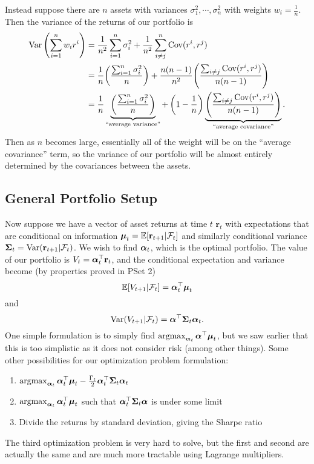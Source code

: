 Instead suppose there are $n$ assets with variances $\sigma_1^2,\cdots,\sigma_n^2$ with weights $w_i=\frac{1}{n}$. Then the variance of the returns of our portfolio is \begin{align*}
	\operatorname{Var} \left( \sum_{i=1}^{n} w_ir^i  \right) &= \frac{1}{n^2} \sum_{i=1}^{n} \sigma_i^2 + \frac{1}{n^2} \sum_{i\neq j}^{n} \operatorname{Cov}(r^i,r^j) \\
											   &= \frac{1}{n} {\left( \frac{\sum_{i=1}^{n} \sigma_i^2}{n} \right)} + \frac{n(n-1)}{n^2} {\left( \frac{\sum_{i\neq j}\operatorname{Cov}(r^i,r^j)}{n(n-1)} \right)} \\
											   &= \frac{1}{n} \underbrace{\left( \frac{\sum_{i=1}^{n} \sigma_i^2}{n} \right)}_{\text{``average variance''}} + \left( 1-\frac{1}{n} \right) \underbrace{\left( \frac{\sum_{i\neq j}\operatorname{Cov}(r^i,r^j)}{n(n-1)} \right)}_{\text{``average covariance''}}.
\end{align*} Then as $n$ becomes large, essentially all of the weight will be on the ``average covariance'' term, so the variance of our portfolio will be almost entirely determined by the covariances between the assets.

\subsection{General Portfolio Setup}
Now suppose we have a vector of asset returns at time $t$ $\mathbf r_t$ with expectations that are conditional on information $\boldsymbol{\mu}_t = \mathbb E[\mathbf r_{t+1}|\mathcal F_t]$ and similarly conditional variance $\boldsymbol{\Sigma}_t = \operatorname{Var}(\mathbf r_{t+1}|\mathcal F_t)$. We wish to find $\boldsymbol{\alpha}_t$, which is the optimal portfolio. The value of our portfolio is $V_t = \boldsymbol{\alpha}_t^\top\mathbf r_t$, and the conditional expectation and variance become (by properties proved in PSet 2) $$ \mathbb E[V_{t+1}|\mathcal F_t] = \boldsymbol{\alpha}_t^\top\boldsymbol{\mu}_t $$ and $$ \operatorname{Var}(V_{t+1}|\mathcal F_t) = \boldsymbol{\alpha}^\top\boldsymbol{\Sigma}_t\boldsymbol{\alpha}_t. $$ One simple formulation is to simply find $\operatorname*{arg max}_{\boldsymbol{\alpha}_t}\boldsymbol{\alpha}^\top\boldsymbol{\mu}_t$, but we saw earlier that this is too simplistic as it does not consider risk (among other things). Some other possibilities for our optimization problem formulation: \begin{enumerate}
	\item $\operatorname*{arg max}_{\boldsymbol{\alpha}_t}\boldsymbol{\alpha}_t^\top\boldsymbol{\mu}_t-\frac{\Gamma_t}{2}\boldsymbol{\alpha}_t^\top\boldsymbol{\Sigma}_t\boldsymbol{\alpha}_t$
	\item $\operatorname*{arg max}_{\boldsymbol{\alpha}_t}\boldsymbol{\alpha}_t^\top\boldsymbol{\mu}_t$ such that $\boldsymbol{\alpha}_t^\top\boldsymbol{\Sigma}_t\boldsymbol{\alpha}$ is under some limit
	\item Divide the returns by standard deviation, giving the Sharpe ratio
\end{enumerate} The third optimization problem is very hard to solve, but the first and second are actually the same and are much more tractable using Lagrange multipliers.

